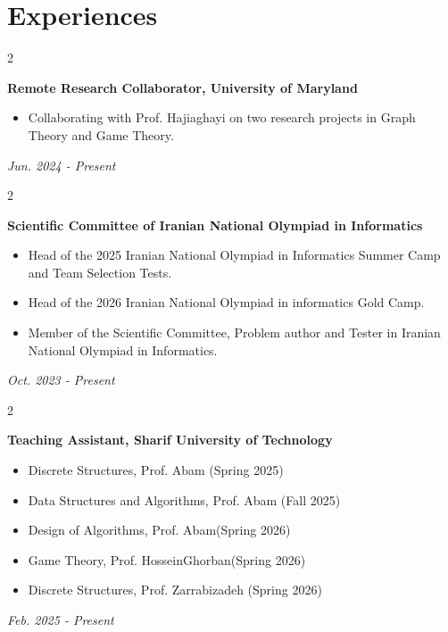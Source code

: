 \documentclass[9pt, letterpaper]{extarticle}
\newenvironment{highlights}{
    \begin{itemize}[
        topsep=0.03 cm,
        parsep=0.03 cm,
        partopsep=0pt,
        itemsep=0pt,
        leftmargin=0.4 cm + 10pt
    ]
}{
    \end{itemize}
} %
\newenvironment{twocolentry}[2][]{
    \onecolentry
    \def\secondColumn{#2}
    \setcolumnwidth{\fill, 4.5 cm}
    \begin{paracol}{2}
}{
    \switchcolumn \raggedleft \secondColumn
    \end{paracol}
    \endonecolentry
} %
\begin{document}
    \section{Experiences}    
    \begin{twocolentry}{
        \textit{Jun. 2024 - Present}    
    }
    \textbf{Remote Research Collaborator, University of Maryland}
    \begin{highlights}
        \item Collaborating with Prof. Hajiaghayi on two research projects in Graph Theory and Game Theory.
    \end{highlights}
    \end{twocolentry}

    \vspace{0.15cm}
    \begin{twocolentry}{
        \textit{Oct. 2023 - Present}    
    }
    \textbf{Scientific Committee of Iranian National Olympiad in Informatics}
    \begin{highlights}
        \item Head of the 2025 Iranian National Olympiad in Informatics Summer Camp and Team Selection Tests.
        \item Head of the 2026 Iranian National Olympiad in informatics Gold Camp.
        \item Member of the Scientific Committee, Problem author and Tester in Iranian National Olympiad in Informatics.
    \end{highlights}
    \end{twocolentry}
    
    \vspace{0.15 cm}
    \begin{twocolentry}{
        \textit{Feb. 2025 - Present}    
    }
    \textbf{Teaching Assistant, Sharif University of Technology}
    \begin{highlights}
        \item Discrete Structures, Prof. Abam (Spring 2025)
        \item Data Structures and Algorithms, Prof. Abam (Fall 2025)
        \item Design of Algorithms, Prof. Abam(Spring 2026)
        \item Game Theory, Prof. HosseinGhorban(Spring 2026)
        \item Discrete Structures, Prof. Zarrabizadeh (Spring 2026)
    \end{highlights}
    \end{twocolentry}
    
\end{document}
